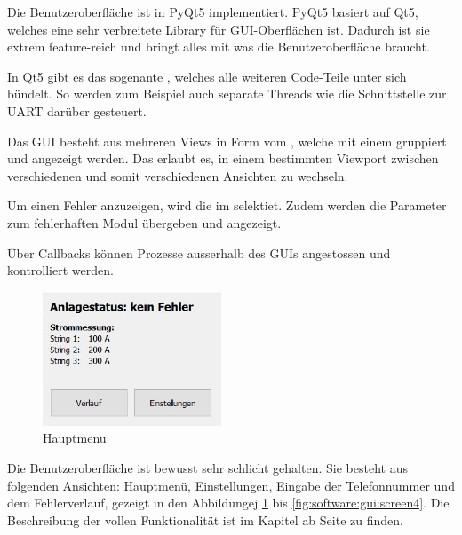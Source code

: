 Die Benutzeroberfl\"ache  ist in  PyQt5 implementiert. PyQt5 basiert  auf Qt5,
welches eine sehr verbreitete Library f\"ur GUI-Oberfl\"achen ist. Dadurch ist
sie extrem  feature-reich und  bringt alles  mit was  die Benutzeroberfl\"ache
braucht.

In  Qt5  gibt  es  das  sogenante  ,  welches  alle  weiteren
Code-Teile unter sich b\"undelt. So werden  zum Beispiel auch separate Threads
wie die Schnittstelle zur UART dar\"uber gesteuert.

Das  GUI  besteht aus  mehreren  Views  in  Form vom  ,  welche
mit   einem      gruppiert  und   angezeigt   werden. Das
  erlaubt  es,  in  einem  bestimmten  Viewport  zwischen
verschiedenen  und somit verschiedenen Ansichten zu wechseln.

Um einen Fehler anzuzeigen, wird die  im 
selektiet. Zudem werden  die Parameter zum fehlerhaften  Modul \"ubergeben und
angezeigt.

\"Uber  Callbacks  k\"onnen  Prozesse  ausserhalb  des  GUIs  angestossen  und
kontrolliert werden.

\clearpage
\begin{figure}
    \includegraphics[width=0.475\textwidth]{images/userguide/screen0.jpg}
    \caption{Hauptmenu}
    \label{fig:software:gui:screen0}
\end{figure}

Die Benutzeroberfl\"ache  ist bewusst sehr schlicht  gehalten. Sie besteht aus
folgenden Ansichten: Hauptmen\"u, Einstellungen, Eingabe der Telefonnummer und
dem Fehlerverlauf,  gezeigt in den  Abbildungej \ref{fig:software:gui:screen0}
bis     \ref{fig:software:gui:screen4}. Die     Beschreibung    der     vollen
Funktionalit\"at  ist  im  Kapitel \emph{}  ab  Seite
\pageref{chap:userguide} zu finden.

